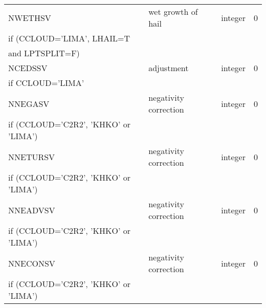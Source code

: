 \begin{longtable} {|p{}|p{}|>{\centering}p{}|p{}<{\centering}|}
NWETHSV & wet growth of hail& integer & 0 \\ \nopagebreak
if (CCLOUD='LIMA', LHAIL=T&&&\\ \nopagebreak
and LPTSPLIT=F)&&& \\\hline

NCEDSSV & adjustment & integer & 0 \\ \nopagebreak
if CCLOUD='LIMA' &&& \\\hline

NNEGASV   & negativity correction & integer  &  0 \\ \nopagebreak
if (CCLOUD='C2R2', 'KHKO' or 'LIMA') &&&\\\hline
NNETURSV  &negativity correction   & integer  &  0 \\ \nopagebreak
if (CCLOUD='C2R2', 'KHKO' or 'LIMA') &&&\\\hline
NNEADVSV  & negativity correction  & integer  &  0 \\ \nopagebreak
if (CCLOUD='C2R2', 'KHKO' or 'LIMA') &&&\\\hline
NNECONSV  &negativity correction    & integer  &  0 \\ \nopagebreak
if (CCLOUD='C2R2', 'KHKO' or 'LIMA') &&&\\\hline
\end{longtable}


